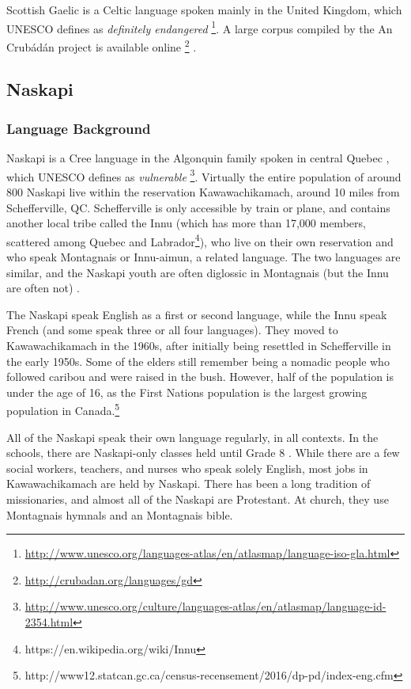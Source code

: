 \documentclass[10pt, a4paper]{article}
\begin{document}
Scottish Gaelic is a Celtic language spoken mainly in the United Kingdom, which UNESCO defines as {\it definitely endangered} \footnote{\href{http://www.unesco.org/languages-atlas/en/atlasmap/language-iso-gla.html}{http://www.unesco.org/languages-atlas/en/atlasmap/language-iso-gla.html}}. A large corpus compiled by the An Crub\'ad\'an project is available online \footnote{\href{http://crubadan.org/languages/gd}{http://crubadan.org/languages/gd}} \cite{scannell2007crubadan}.

\subsection{Naskapi}

\subsubsection{Language Background}

Naskapi is a Cree language in the Algonquin family spoken in central Quebec \cite{MacKenzie-and-Jancewicz-1994}, which UNESCO defines as {\it vulnerable} \footnote{\href{http://www.unesco.org/culture/languages-atlas/en/atlasmap/language-id-2354.html}{http://www.unesco.org/culture/languages-atlas/en/atlasmap/language-id-2354.html}}. Virtually the entire population of around 800 Naskapi live within the reservation Kawawachikamach, around 10 miles from Schefferville, QC. Schefferville is only accessible by train or plane, and contains another local tribe called the Innu (which has more than 17,000 members, scattered among Quebec and Labrador\footnote{https://en.wikipedia.org/wiki/Innu}), who live on their own reservation and who speak Montagnais or Innu-aimun, a related language. The two languages are similar, and the Naskapi youth are often diglossic in Montagnais (but the Innu are often not) \cite{MacKenzie-1980}.

The Naskapi speak English as a first or second language, while the Innu speak French (and some speak three or all four languages). They moved to Kawawachikamach in the 1960s, after initially being resettled in Schefferville in the early 1950s. Some of the elders still remember being a nomadic people who followed caribou and were raised in the bush. However, half of the population is under the age of 16, as the First Nations population is the largest growing population in Canada.\footnote{http://www12.statcan.gc.ca/census-recensement/2016/dp-pd/index-eng.cfm}

All of the Naskapi speak their own language regularly, in all contexts. In the schools, there are Naskapi-only classes held until Grade 8 \cite{llewellyn2017oral}. While there are a few social workers, teachers, and nurses who speak solely English, most jobs in Kawawachikamach are held by Naskapi. There has been a long tradition of missionaries, and almost all of the Naskapi are Protestant. At church, they use Montagnais hymnals and an Montagnais bible.
\end{document}

